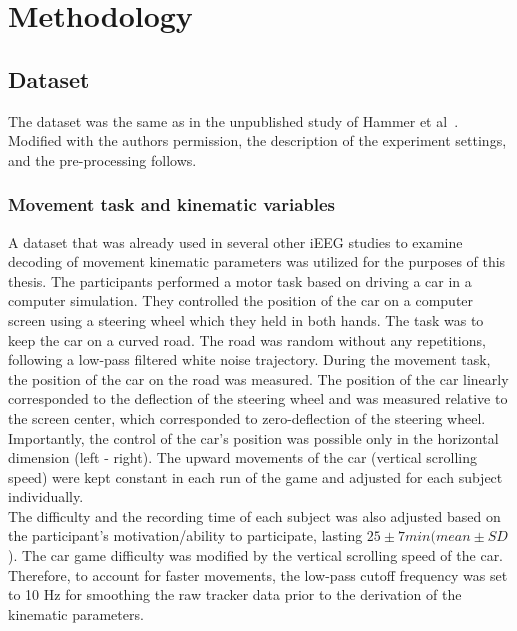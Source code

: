 \chapter{Methodology}\label{ch:methodology}


\section{Dataset}\label{sec:dataset}
The dataset was the same as in the unpublished study of Hammer et al~\cite{Hammer-2021}.
Modified with the authors permission, the description of the experiment settings, and the pre-processing follows.

\subsection{Movement task and kinematic variables}\label{subsec:movement-task-and-kinematic-variables}
A dataset that was already used in several other iEEG studies to examine decoding of movement kinematic parameters\cite{Hammer-2021,hammer-predominance-2016,hammer-role-2013} was utilized for the purposes of this thesis.
The participants performed a motor task based on driving a car in a computer simulation.
They controlled the position of the car on a computer screen using a steering wheel which they held in both hands.
The task was to keep the car on a curved road.
The road was random without any repetitions, following a low-pass filtered white noise trajectory.
During the movement task, the position of the car on the road was measured.
The position of the car linearly corresponded to the deflection of the steering wheel and was measured relative to the screen center, which corresponded to zero-deflection of the steering wheel.
Importantly, the control of the car's position was possible only in the horizontal dimension (left - right).
The upward movements of the car (vertical scrolling speed) were kept constant in each run of the game and adjusted for each subject individually. \\

The difficulty and the recording time of each subject was also adjusted based on the participant's motivation/ability to participate, lasting $25 \pm 7 min (mean \pm SD$).
The car game difficulty was modified by the vertical scrolling speed of the car.
Therefore, to account for faster movements, the low-pass cutoff frequency was set to 10 Hz for smoothing the raw tracker data prior to the derivation of the kinematic parameters. \\

